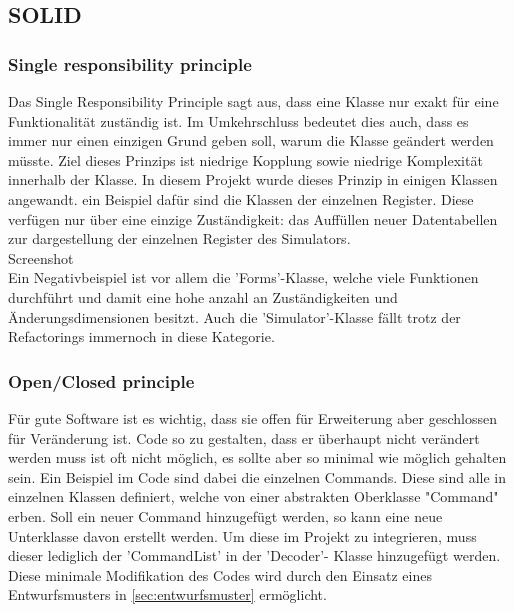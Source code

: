 \documentclass[12pt,a4paper,titlepage,ngerman,pdftex]{report}
\begin{document}
    \subsection{SOLID}\label{subsec:solid}
    
    \subsubsection{Single responsibility principle}\label{subsubsec:single_responsibility}
    Das Single Responsibility Principle sagt aus, dass eine Klasse nur exakt für eine Funktionalität zuständig ist. Im Umkehrschluss bedeutet dies auch, dass es immer nur einen einzigen Grund geben soll, warum die Klasse geändert werden müsste.
    Ziel dieses Prinzips ist niedrige Kopplung sowie niedrige Komplexität innerhalb der Klasse. In diesem Projekt wurde dieses Prinzip in einigen Klassen angewandt. ein Beispiel dafür sind die Klassen der einzelnen Register. 
    Diese verfügen nur über eine einzige Zuständigkeit: das Auffüllen neuer Datentabellen zur dargestellung der einzelnen Register des Simulators.
    \\
    Screenshot
    \\

    Ein Negativbeispiel ist vor allem die 'Forms'-Klasse, welche viele Funktionen durchführt und damit eine hohe anzahl an Zuständigkeiten und Änderungsdimensionen besitzt. Auch die 'Simulator'-Klasse fällt trotz der Refactorings immernoch in diese Kategorie. 



    \subsubsection{Open/Closed principle}
    Für gute Software ist es wichtig, dass sie offen für Erweiterung aber geschlossen für Veränderung ist. Code so zu gestalten, dass er überhaupt nicht verändert werden muss ist oft nicht möglich, es sollte aber so minimal wie möglich gehalten sein. Ein Beispiel im Code sind dabei die einzelnen Commands.
    Diese sind alle in einzelnen Klassen definiert, welche von einer abstrakten Oberklasse "Command" erben. Soll ein neuer Command hinzugefügt werden, so kann eine neue Unterklasse davon erstellt werden. Um diese im Projekt zu integrieren, muss dieser lediglich der 'CommandList' in der 'Decoder'- Klasse hinzugefügt werden.
    Diese minimale Modifikation des Codes wird durch den Einsatz eines Entwurfsmusters in \autoref{sec:entwurfsmuster} ermöglicht. 
\end{document}
